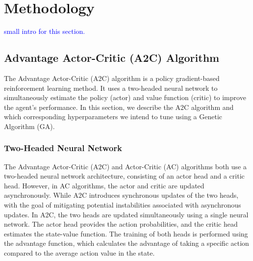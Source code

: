 \documentclass{article}
\newcommand{\TODO}[1]{\textcolor{blue}{#1}}
\begin{document}
\section{Methodology}
\label{sec:meth}

\TODO{small intro for this section.}

\subsection{Advantage Actor-Critic (A2C) Algorithm}
\label{ssec:A2C}

The Advantage Actor-Critic (A2C) algorithm is a policy gradient-based reinforcement learning method.
It uses a two-headed neural network to simultaneously estimate the policy (actor) and value function (critic) to improve the agent's performance.
In this section, we describe the A2C algorithm and which corresponding hyperparameters we intend to tune using a Genetic Algorithm (GA).


\subsubsection{Two-Headed Neural Network}
\label{sssec:2hnn}

The Advantage Actor-Critic (A2C) and Actor-Critic (AC) algorithms both use a two-headed neural network architecture, consisting of an actor head and a critic head.
However, in AC algorithms, the actor and critic are updated asynchronously.
While A2C introduces synchronous updates of the two heads, with the goal of mitigating potential instabilities associated with asynchronous updates.
In A2C, the two heads are updated simultaneously using a single neural network.
The actor head provides the action probabilities, and the critic head estimates the state-value function.
The training of both heads is performed using the advantage function, which calculates the advantage of taking a specific action compared to the average action value in the state.
\end{document}
